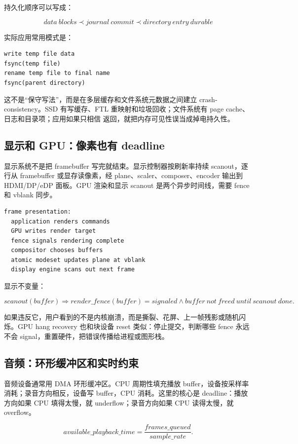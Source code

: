 持久化顺序可以写成：

\[
data\ blocks \prec journal\ commit \prec directory\ entry\ durable
\]

实际应用常用模式是：

\begin{lstlisting}
write temp file data
fsync(temp file)
rename temp file to final name
fsync(parent directory)
\end{lstlisting}

这不是“保守写法”，而是在多层缓存和文件系统元数据之间建立 crash-consistency。SSD 有写缓存、FTL 重映射和垃圾回收；文件系统有 page cache、日志和目录项；应用如果只相信  返回，就把内存可见性误当成掉电持久性。

\subsection{显示和 GPU：像素也有 deadline}

显示系统不是把 framebuffer 写完就结束。显示控制器按刷新率持续 scanout，逐行从 framebuffer 或显存读像素，经 plane、scaler、composer、encoder 输出到 HDMI/DP/eDP 面板。GPU 渲染和显示 scanout 是两个异步时间线，需要 fence 和 vblank 同步。

\begin{lstlisting}
frame presentation:
  application renders commands
  GPU writes render target
  fence signals rendering complete
  compositor chooses buffers
  atomic modeset updates plane at vblank
  display engine scans out next frame
\end{lstlisting}

显示不变量：

\[
scanout(buffer)\Rightarrow render\_fence(buffer)=signaled
\land buffer\ not\ freed\ until\ scanout\ done.
\]

如果违反它，用户看到的不是内核崩溃，而是撕裂、花屏、上一帧残影或随机闪烁。GPU hang recovery 也和块设备 reset 类似：停止提交，判断哪些 fence 永远不会 signal，重置硬件，把错误传播给进程或图形栈。

\subsection{音频：环形缓冲区和实时约束}

音频设备通常用 DMA 环形缓冲区。CPU 周期性填充播放 buffer，设备按采样率消耗；录音方向相反，设备写 buffer，CPU 消耗。这里的核心是 deadline：播放方向如果 CPU 填得太慢，就 underflow；录音方向如果 CPU 读得太慢，就 overflow。

\[
available\_playback\_time
= \frac{frames\_queued}{sample\_rate}.
\]

